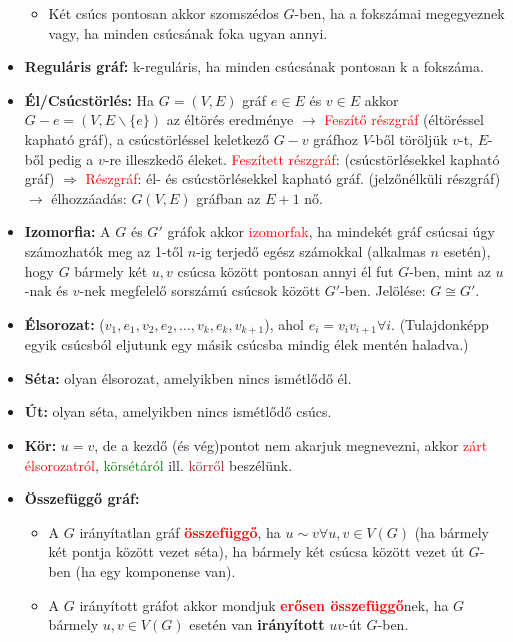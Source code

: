 \documentclass[../../szobeli.tex]{subfiles}
\begin{document}
\begin{itemize}
\begin{itemize}
            \item Két csúcs pontosan akkor szomszédos $G$-ben, ha a fokszámai megegyeznek vagy, ha minden csúcsának foka ugyan annyi.
        \end{itemize}
        \item \textbf{Reguláris gráf:} k-reguláris, ha minden csúcsának pontosan k a fokszáma.
        \item \textbf{Él/Csúcstörlés:} Ha $G=(V,E)$ gráf $e \in E$ és $v \in E$ akkor $G-e=(V,E \backslash \{e\})$ az éltörés eredménye $\rightarrow$ \textcolor{red}{Feszítő részgráf} (éltöréssel kapható gráf), a csúcstörléssel keletkező $G-v$ gráfhoz $V$-ből töröljük $v$-t, $E$-ből pedig a $v$-re illeszkedő éleket. \textcolor{red}{Feszített részgráf}: (csúcstörlésekkel kapható gráf) $\Rightarrow$ \textcolor{red}{Részgráf}: él- és csúcstörlésekkel kapható gráf. (jelzőnélküli részgráf) $\rightarrow$ élhozzáadás: $G(V,E)$ gráfban az $E+1$ nő.
        \item \textbf{Izomorfia:} A $G$ és $G'$ gráfok akkor \textcolor{red}{izomorfak}, ha mindekét gráf csúcsai úgy számozhatók meg az 1-től $n$-ig terjedő egész számokkal (alkalmas $n$ esetén), hogy $G$ bármely két $u,v$ csúcsa között pontosan annyi él fut $G$-ben, mint az $u$-nak és $v$-nek megfelelő sorszámú csúcsok között $G'$-ben. Jelölése: $G \cong G'$.
        \item \textbf{Élsorozat:} ($v_1,e_1,v_2,e_2,\dots,v_k,e_k,v_{k+1}$), ahol $e_i=v_i v_{i+1}\forall i$. (Tulajdonképp egyik csúcsból eljutunk egy másik csúcsba mindig élek mentén haladva.)
        \item \textbf{Séta:} olyan élsorozat, amelyikben nincs ismétlődő él. 	
        \item \textbf{Út:} olyan séta, amelyikben nincs ismétlődő csúcs.
        \item \textbf{Kör:} $u = v$, de a kezdő (és vég)pontot nem akarjuk megnevezni, akkor \textcolor{red}{zárt élsorozatról}, \textcolor{green}{körsétáról} ill. \textcolor{brown}{körről} beszélünk.
        \item \textbf{Összefüggő gráf:} \begin{itemize}
            \item A $G$ irányítatlan gráf \textcolor{red}{\textbf{összefüggő}}, ha $u \sim v \forall u,v \in V(G)$ (ha bármely két pontja között vezet séta), ha bármely két csúcsa között vezet út $G$-ben (ha egy komponense van).
            \item A $G$ irányított gráfot akkor mondjuk \textcolor{red}{\textbf{erősen összefüggő}}nek, ha $G$ bármely $u,v \in V(G) $ esetén van \textbf{irányított} $uv$-út $G$-ben.

\end{itemize}
\end{itemize}
\end{document}
